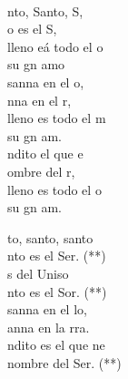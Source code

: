\documentclass[12pt]{article}
\begin{document}
\begin{multicols*}{2}
\begin{cancion}[Santo][Mocedades]%
{}\vspace*{-0.4cm}\\
	nto, Santo, S,\\
	o es el S,\\
	lleno eá todo el o\\
	 su gn amo \\
	sanna en el o,\\
	nna en el r,\\
	lleno es todo el m \\
	 su gn am.\\
	ndito el que e\\
	ombre del r,\\
	lleno es todo el o \\
	 su gn am.\\
\end{cancion}%

\begin{cancion}[Santo][Peruano]%
	to, santo, santo\\
	nto es el Ser. (**)\\
	s del Uniso\\
	nto es el Sor. (**)\\
	sanna en el lo,\\
	anna en la rra.\\
	ndito es el que ne\\
	nombre del Ser. (**)\\
\end{cancion}%


\end{multicols*}
\end{document}
